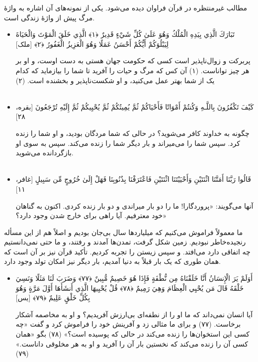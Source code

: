 مطالب غیرمنتظره در قرآن فراوان دیده می‌شود. یکی از نمونه‌های آن اشاره به واژهٔ مرگ پیش از واژهٔ زندگی است.
\begin{itemize}
	\item[]
	{
		تَبَارَكَ الَّذِي بِيَدِهِ الْمُلْكُ وَهُوَ عَلَىٰ كُلِّ شَيْءٍ قَدِيرٌ ﴿١﴾ الَّذِي خَلَقَ الْمَوْتَ وَالْحَيَاةَ لِيَبْلُوَكُمْ أَيُّكُمْ أَحْسَنُ عَمَلًا  وَهُوَ الْعَزِيزُ الْغَفُورُ ﴿٢﴾ [ملک]}
	
	{
		پربرکت و زوال‌ناپذیر است کسی که حکومت جهان هستی به دست اوست، و او بر هر چیز تواناست. (۱) آن کس که مرگ و حیات را آفرید تا شما را بیازماید که کدام یک از شما بهتر عمل می‌کنید، و او شکست‌ناپذیر و بخشنده است. (۲) 
	}
	~\\~
	\item []
	{
		
		كَيْفَ تَكْفُرُونَ بِاللَّـهِ وَكُنتُمْ أَمْوَاتًا فَأَحْيَاكُمْ ثُمَّ يُمِيتُكُمْ ثُمَّ يُحْيِيكُمْ ثُمَّ إِلَيْهِ تُرْجَعُونَ [بقره، ۲۸]}
	
	{
		چگونه به خداوند کافر می‌شوید؟ در حالی که شما مردگان بودید، و او شما را زنده کرد. سپس شما را می‌میراند و بار دیگر شما را زنده می‌کند. سپس به سوی او بازگردانده می‌شوید. 
	}
	~\\~
	\item []
	{
		قَالُوا رَبَّنَا أَمَتَّنَا اثْنَتَيْنِ وَأَحْيَيْتَنَا اثْنَتَيْنِ فَاعْتَرَفْنَا بِذُنُوبِنَا فَهَلْ إِلَىٰ خُرُوجٍ مِّن سَبِيلٍ [غافر، ۱۱]}
	
	{
		آنها می‌گویند: «پروردگارا! ما را دو بار میراندی و دو بار زنده کردی. اکنون به گناهان خود معترفیم. آیا راهی برای خارج شدن وجود دارد؟» 
	}
	
\end{itemize}

ما معمولاً فراموش می‌کنیم که میلیاردها سال بی‌جان بودیم و اصلاً هم از این مسأله رنجیده‌خاطر نبودیم. زمین شکل گرفت، تمدن‌ها آمدند و رفتند، و ما حتی نمی‌دانستیم چه اتفاقی دارد می‌افتد. و سپس زیستن را تجربه کردیم. تأکید قرآن نیز بر آن است که همان طوری که یک بار قبلاً به دنیا آمدیم، بار دیگر نیز امکان تولد وجود دارد. 

\begin{itemize}
	\item[]
	
	{
		أَوَلَمْ يَرَ الْإِنسَانُ أَنَّا خَلَقْنَاهُ مِن نُّطْفَةٍ فَإِذَا هُوَ خَصِيمٌ مُّبِينٌ ﴿٧٧﴾ وَضَرَبَ لَنَا مَثَلًا وَنَسِيَ خَلْقَهُ قَالَ مَن يُحْيِي الْعِظَامَ وَهِيَ رَمِيمٌ ﴿٧٨﴾ قُلْ يُحْيِيهَا الَّذِي أَنشَأَهَا أَوَّلَ مَرَّةٍ وَهُوَ بِكُلِّ خَلْقٍ عَلِيمٌ ﴿٧٩﴾ [یس]
	}
	
	{
		آیا انسان نمی‌داند که ما او را از نطفه‌ای بی‌ارزش آفریدیم؟ و او به مخاصمه آشکار برخاست. (۷۷) و برای ما مثالی زد و آفرینش خود را فراموش کرد و گفت «چه کسی این استخوان‌ها را زنده می‌کند در حالی که پوسیده است؟» (۷۸) بگو «همان کسی آن را زنده می‌کند که نخستین بار آن را آفرید و او به هر مخلوقی داناست.» (۷۹)}
\end{itemize}

